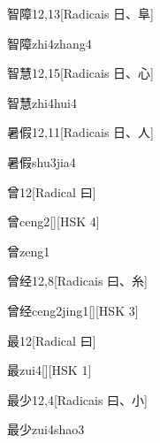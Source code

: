 \begin{entry}{智障}{12,13}[Radicais ⽇、⾩]
  \begin{phonetics}{智障}{zhi4zhang4}
  \end{phonetics}
\end{entry}

\begin{entry}{智慧}{12,15}[Radicais ⽇、⼼]
  \begin{phonetics}{智慧}{zhi4hui4}
  \end{phonetics}
\end{entry}

\begin{entry}{暑假}{12,11}[Radicais ⽇、⼈]
  \begin{phonetics}{暑假}{shu3jia4}
  \end{phonetics}
\end{entry}

\begin{entry}{曾}{12}[Radical ⽈]
  \begin{phonetics}{曾}{ceng2}[][HSK 4]
  \end{phonetics}
  \begin{phonetics}{曾}{zeng1}
  \end{phonetics}
\end{entry}

\begin{entry}{曾经}{12,8}[Radicais ⽈、⽷]
  \begin{phonetics}{曾经}{ceng2jing1}[][HSK 3]
  \end{phonetics}
\end{entry}

\begin{entry}{最}{12}[Radical ⽈]
  \begin{phonetics}{最}{zui4}[][HSK 1]
  \end{phonetics}
\end{entry}

\begin{entry}{最少}{12,4}[Radicais ⽈、⼩]
  \begin{phonetics}{最少}{zui4shao3}
  \end{phonetics}
\end{entry}

